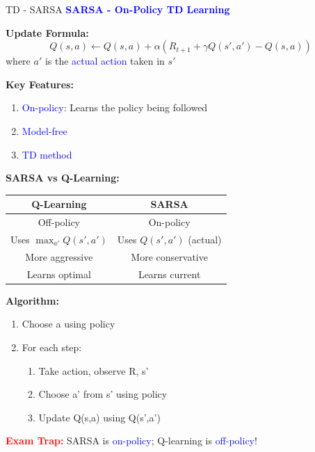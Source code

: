 \documentclass[8pt]{beamer}
\begin{document}
	\begin{frame}{TD - SARSA}
		\fontsize{6.5}{7.5}\selectfont
		\textcolor{blue}{\textbf{SARSA - On-Policy TD Learning}}
		
		\textbf{Update Formula:}
		\[
		Q(s,a) \leftarrow Q(s,a) + \alpha(R_{t+1} + \gamma Q(s',a') - Q(s,a))
		\]
		where $a'$ is the \textcolor{blue}{actual action} taken in $s'$
		
		\textbf{Key Features:}
		\begin{enumerate}
			\item \textcolor{blue}{On-policy}: Learns the policy being followed
			\item \textcolor{blue}{Model-free}
			\item \textcolor{blue}{TD method}
		\end{enumerate}
		
		\textbf{SARSA vs Q-Learning:}
		\begin{tabular}{|c|c|}
			\hline
			Q-Learning & SARSA \\
			\hline
			Off-policy & On-policy \\
			\hline
			Uses $\max_{a'} Q(s',a')$ & Uses $Q(s',a')$ (actual) \\
			\hline
			More aggressive & More conservative \\
			\hline
			Learns optimal & Learns current \\
			\hline
		\end{tabular}
		
		\textbf{Algorithm:}
		\begin{enumerate}
			\item Choose a using policy
			\item For each step:
			\begin{enumerate}
				\item Take action, observe R, s'
				\item Choose a' from s' using policy
				\item Update Q(s,a) using Q(s',a')
			\end{enumerate}
		\end{enumerate}
		
		\textcolor{red}{\textbf{Exam Trap:}} SARSA is \textcolor{blue}{on-policy}; Q-learning is \textcolor{blue}{off-policy}!
	\end{frame}
	
\end{document}
